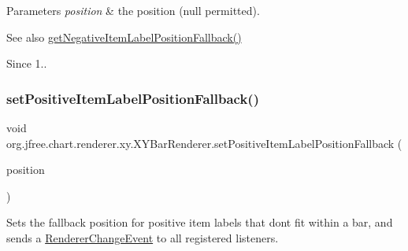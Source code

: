 \begin{DoxyParams}{Parameters}
{\em position} & the position ({\ttfamily null} permitted).\\
\hline
\end{DoxyParams}
\begin{DoxySeeAlso}{See also}
\mbox{\hyperlink{classorg_1_1jfree_1_1chart_1_1renderer_1_1xy_1_1_x_y_bar_renderer_a3997bb98cb08e43cf7c36bfd82e9b705}{get\+Negative\+Item\+Label\+Position\+Fallback()}} 
\end{DoxySeeAlso}
\begin{DoxySince}{Since}
1.. 
\end{DoxySince}
\mbox{\label{classorg_1_1jfree_1_1chart_1_1renderer_1_1xy_1_1_x_y_bar_renderer_ac50ea70166531d36a013b4f600c90584}} 
\subsubsection{\texorpdfstring{set\+Positive\+Item\+Label\+Position\+Fallback()}{setPositiveItemLabelPositionFallback()}}
{\footnotesize\ttfamily void org.\+jfree.\+chart.\+renderer.\+xy.\+X\+Y\+Bar\+Renderer.\+set\+Positive\+Item\+Label\+Position\+Fallback (\begin{DoxyParamCaption}\item[{\mbox{\hyperlink{classorg_1_1jfree_1_1chart_1_1labels_1_1_item_label_position}{Item\+Label\+Position}}}]{position }\end{DoxyParamCaption})}

Sets the fallback position for positive item labels that don\textquotesingle{}t fit within a bar, and sends a \mbox{\hyperlink{}{Renderer\+Change\+Event}} to all registered listeners.


